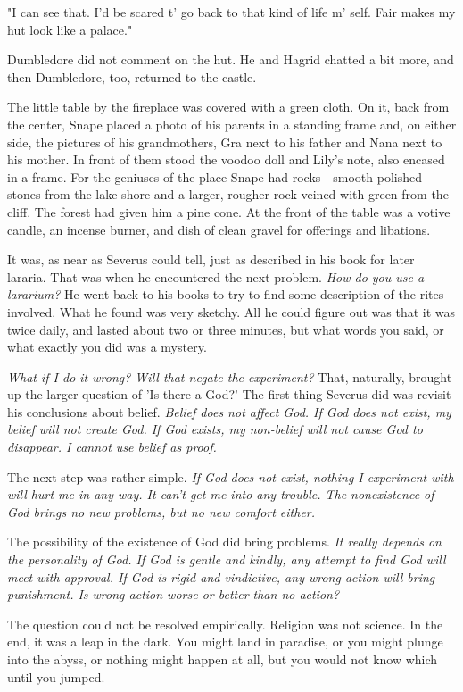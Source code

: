 \documentclass[a4paper,11pt]{article}
\begin{document}
"I can see that. I'd be scared t' go back to that kind of life m' self. Fair makes my hut look like a palace."

Dumbledore did not comment on the hut. He and Hagrid chatted a bit more, and then Dumbledore, too, returned to the castle.

The little table by the fireplace was covered with a green cloth. On it, back from the center, Snape placed a photo of his parents in a standing frame and, on either side, the pictures of his grandmothers, Gra next to his father and Nana next to his mother. In front of them stood the voodoo doll and Lily's note, also encased in a frame. For the geniuses of the place Snape had rocks - smooth polished stones from the lake shore and a larger, rougher rock veined with green from the cliff. The forest had given him a pine cone. At the front of the table was a votive candle, an incense burner, and dish of clean gravel for offerings and libations.

It was, as near as Severus could tell, just as described in his book for later lararia. That was when he encountered the next problem. \emph{How do you use a lararium?} He went back to his books to try to find some description of the rites involved. What he found was very sketchy. All he could figure out was that it was twice daily, and lasted about two or three minutes, but what words you said, or what exactly you did was a mystery.

\emph{What if I do it wrong? Will that negate the experiment?} That, naturally, brought up the larger question of 'Is there a God?' The first thing Severus did was revisit his conclusions about belief. \emph{Belief does not affect God. If God does not exist, my belief will not create God. If God exists, my non-belief will not cause God to disappear. I cannot use belief as proof.}

The next step was rather simple. \emph{If God does not exist, nothing I experiment with will hurt me in any way. It can't get me into any trouble. The nonexistence of God brings no new problems, but no new comfort either.}

The possibility of the existence of God did bring problems. \emph{It really depends on the personality of God. If God is gentle and kindly, any attempt to find God will meet with approval. If God is rigid and vindictive, any wrong action will bring punishment. Is wrong action worse or better than no action?}

The question could not be resolved empirically. Religion was not science. In the end, it was a leap in the dark. You might land in paradise, or you might plunge into the abyss, or nothing might happen at all, but you would not know which until you jumped.
\end{document}
